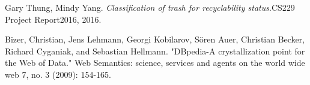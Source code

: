 \documentclass{Classes/UITBA}
\begin{document}

\pagestyle{empty}
%
\clearpage
\restoregeometry

%
%
%

\pagestyle{empty}
\tableofcontents
 
\clearpage
\pagestyle{plain}
\setcounter{page}{1}





\cite{DBPedia}







% 

\begin{thebibliography}{SJL05}

 Gary Thung, Mindy Yang. \textit{Classification of trash for recyclability status}.CS229 Project Report2016, 2016.

 Bizer, Christian, Jens Lehmann, Georgi Kobilarov, Sören Auer, Christian Becker, Richard Cyganiak, and Sebastian Hellmann. "DBpedia-A crystallization point for the Web of Data." Web Semantics: science, services and agents on the world wide web 7, no. 3 (2009): 154-165.
    

\end{thebibliography}
\end{document}
